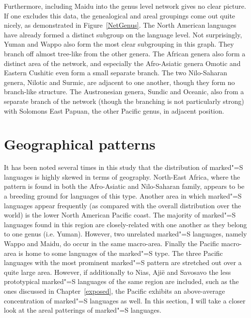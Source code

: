 Furthermore, including Maidu into the genus level network gives no clear picture. 
If one excludes this data, the genealogical and areal groupings come out quite nicely, as demonstrated in Figure~\ref{NetGenus}.
The North American languages have already formed a distinct subgroup on the language level. 
Not surprisingly, Yuman and Wappo also form the most clear subgrouping in this graph. 
They branch off almost tree-like from the other genera. 
The African genera also form a distinct area of the network, and especially the Afro-Asiatic genera Omotic and Eastern Cushitic even form a small separate branch. 
The two Nilo-Saharan genera, Nilotic and Surmic, are adjacent to one another, though they form no branch-like structure. 
The Austronesian genera, Sundic and Oceanic, also from a separate branch of the network (though the branching is not particularly strong) with Solomons East Papuan, the other Pacific genus, in adjacent position.



\section{Geographical patterns}\label{area}

It has been noted several times in this study that the distribution of marked"=S languages is highly skewed in terms of geography.
\enlargethispage{\baselineskip}
North-East Africa, where the pattern is found in both the Afro-Asiatic and Nilo-Saharan family, appears to be a breeding ground for languages of this type. 
Another area in which marked"=S languages appear frequently (as compared with the overall distribution over the world) is the lower North American Pacific coast. 
The majority of marked"=S languages found in this region are closely-related with one another as they belong to one genus (i.e. Yuman). 
However, two unrelated marked"=S languages, namely Wappo and Maidu, do occur in the same macro-area.
Finally the Pacific macro-area is home to some languages of the marked"=S type.
The three Pacific languages with the most prominent marked"=S pattern are stretched out over a quite large area. 
However, if additionally to Nias, Aji\"e and Savosavo the less prototypical marked"=S languages of the same region are included, such as the ones discussed in Chapter~\ref{exposed}, the Pacific exhibits an above-average concentration of marked"=S languages as well. 
In this section, I will take a closer look at the areal patterings of marked"=S languages.

